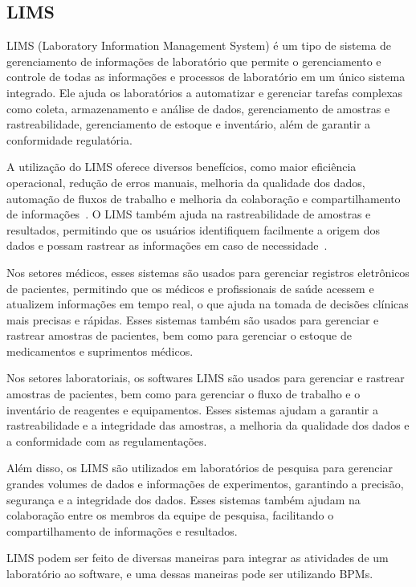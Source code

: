 \subsection{LIMS}


LIMS (Laboratory Information Management System) é um tipo de sistema de gerenciamento de informações de laboratório que permite o gerenciamento e controle de todas as informações e processos de laboratório em um único sistema integrado. Ele ajuda os laboratórios a automatizar e gerenciar tarefas complexas como coleta, armazenamento e análise de dados, gerenciamento de amostras e rastreabilidade, gerenciamento de estoque e inventário, além de garantir a conformidade regulatória.


A utilização do LIMS oferece diversos benefícios, como maior eficiência operacional, redução de erros manuais, melhoria da qualidade dos dados, automação de fluxos de trabalho e melhoria da colaboração e compartilhamento de informações~\cite{Key2011LIMS:Systems}. O LIMS também ajuda na rastreabilidade de amostras e resultados, permitindo que os usuários identifiquem facilmente a origem dos dados e possam rastrear as informações em caso de necessidade~\cite{Cagindi2004ImportanceFactories}.


Nos setores médicos, esses sistemas são usados para gerenciar registros eletrônicos de pacientes, permitindo que os médicos e profissionais de saúde acessem e atualizem informações em tempo real, o que ajuda na tomada de decisões clínicas mais precisas e rápidas. Esses sistemas também são usados para gerenciar e rastrear amostras de pacientes, bem como para gerenciar o estoque de medicamentos e suprimentos médicos.

Nos setores laboratoriais, os softwares LIMS são usados para gerenciar e rastrear amostras de pacientes, bem como para gerenciar o fluxo de trabalho e o inventário de reagentes e equipamentos. Esses sistemas ajudam a garantir a rastreabilidade e a integridade das amostras, a melhoria da qualidade dos dados e a conformidade com as regulamentações.

Além disso, os LIMS são utilizados em laboratórios de pesquisa para gerenciar grandes volumes de dados e informações de experimentos, garantindo a precisão, segurança e a integridade dos dados. Esses sistemas também ajudam na colaboração entre os membros da equipe de pesquisa, facilitando o compartilhamento de informações e resultados.

LIMS podem ser feito de diversas maneiras para integrar as atividades de um laboratório ao software, e uma dessas maneiras pode ser utilizando BPMs.


